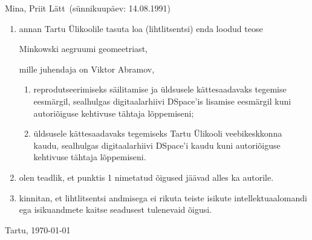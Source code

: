 \documentclass[12pt,a4paper,oneside]{article}
\theoremstyle{plain}
\theoremstyle{definition}
\numberwithin{equation}{section}
\def\title{Minkowski aegruumi geomeetriast}
\def\author{Priit Lätt}
\begin{document}
Mina, \author\ (sünnikuupäev: 14.08.1991)
\begin{enumerate}
	\item annan Tartu Ülikoolile tasuta loa (lihtlitsentsi) 
	enda loodud teose
	\begin{center}
	\title,
	\end{center}
	mille juhendaja on Viktor Abramov,
	\begin{enumerate}
		\item reprodutseerimiseks säilitamise ja üldsusele 
		kättesaadavaks tegemise eesmärgil, sealhulgas 
		digitaalarhiivi DSpace'is lisamise eesmärgil kuni 
		autoriõiguse kehtivuse tähtaja lõppemiseni;
		\item üldsusele kättesaadavaks tegemiseks Tartu Ülikooli 
		veebikeskkonna kaudu, sealhulgas digitaalarhiivi 
		DSpace'i kaudu kuni autoriõiguse kehti\-vuse tähtaja lõppemiseni.
	\end{enumerate}
	\item olen teadlik, et punktis 1 nimetatud õigused jäävad 
	alles ka autorile.
	\item kinnitan, et lihtlitsentsi andmisega ei rikuta teiste 
	isikute intellektuaal\-o\-mandi ega isikuandmete kaitse 
	seadusest tulenevaid õigusi.
\end{enumerate}

\vfill

\begin{center}
Tartu, \ddmmyyyydate \today
\end{center}
\end{document}
